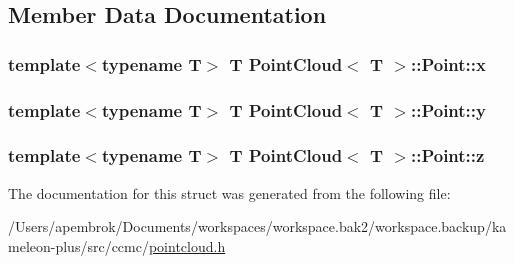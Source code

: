 \subsection{Member Data Documentation}
\hypertarget{struct_point_cloud_1_1_point_a4c9755e331a4b3c82f69bf73573a85cb}{
\subsubsection[{x}]{\setlength{\rightskip}{0pt plus 5cm}template$<$typename T$>$ T {\bf Point\-Cloud}$<$ T $>$\-::Point\-::x}}\label{struct_point_cloud_1_1_point_a4c9755e331a4b3c82f69bf73573a85cb}
\hypertarget{struct_point_cloud_1_1_point_a04e6140b52712a7fcabdb3b8d06040fc}{
\subsubsection[{y}]{\setlength{\rightskip}{0pt plus 5cm}template$<$typename T$>$ T {\bf Point\-Cloud}$<$ T $>$\-::Point\-::y}}\label{struct_point_cloud_1_1_point_a04e6140b52712a7fcabdb3b8d06040fc}
\hypertarget{struct_point_cloud_1_1_point_a606a44d077bc9f483cf6ff58c4896a14}{
\subsubsection[{z}]{\setlength{\rightskip}{0pt plus 5cm}template$<$typename T$>$ T {\bf Point\-Cloud}$<$ T $>$\-::Point\-::z}}\label{struct_point_cloud_1_1_point_a606a44d077bc9f483cf6ff58c4896a14}


The documentation for this struct was generated from the following file\-:\begin{DoxyCompactItemize}
\item 
/\-Users/apembrok/\-Documents/workspaces/workspace.\-bak2/workspace.\-backup/kameleon-\/plus/src/ccmc/\hyperlink{pointcloud_8h}{pointcloud.\-h}\end{DoxyCompactItemize}
